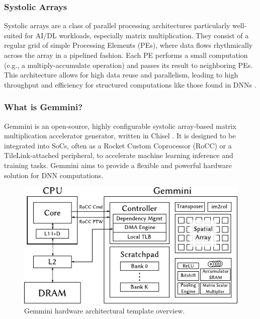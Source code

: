 \subsubsection{Systolic Arrays}
Systolic arrays are a class of parallel processing architectures particularly well-suited for AI/DL workloads, especially matrix multiplication. They consist of a regular grid of simple Processing Elements (PEs), where data flows rhythmically across the array in a pipelined fashion. Each PE performs a small computation (e.g., a multiply-accumulate operation) and passes its result to neighboring PEs. This architecture allows for high data reuse and parallelism, leading to high throughput and efficiency for structured computations like those found in DNNs \cite{kung1982systolic}.

\subsubsection{What is Gemmini?}
Gemmini is an open-source, highly configurable systolic array-based matrix multiplication accelerator generator, written in Chisel \cite{genc2019gemmini, chipyard}. It is designed to be integrated into SoCs, often as a Rocket Custom Coprocessor (RoCC) or a TileLink-attached peripheral, to accelerate machine learning inference and training tasks. Gemmini aims to provide a flexible and powerful hardware solution for DNN computations.

\begin{figure}[htbp]
    \centering
    \includegraphics[width=0.75\linewidth]{Images/04_Gemmini_ArchitectureOverview.pdf}
    \caption{Gemmini hardware architectural template overview.}
    \label{fig:gemmini_architecture}
\end{figure}

